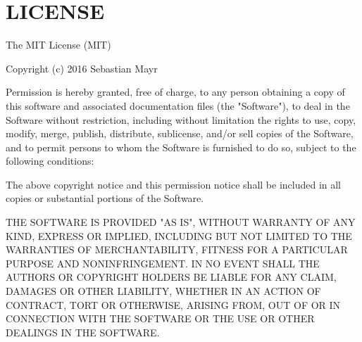 \chapter{LICENSE}
\hypertarget{md_pkiclassroomrescheduler_2src_2main_2frontend_2node__modules_2tr46_2_l_i_c_e_n_s_e}{}\label{md_pkiclassroomrescheduler_2src_2main_2frontend_2node__modules_2tr46_2_l_i_c_e_n_s_e}
The MIT License (MIT)

Copyright (c) 2016 Sebastian Mayr

Permission is hereby granted, free of charge, to any person obtaining a copy of this software and associated documentation files (the "{}\+Software"{}), to deal in the Software without restriction, including without limitation the rights to use, copy, modify, merge, publish, distribute, sublicense, and/or sell copies of the Software, and to permit persons to whom the Software is furnished to do so, subject to the following conditions\+:

The above copyright notice and this permission notice shall be included in all copies or substantial portions of the Software.

THE SOFTWARE IS PROVIDED "{}\+AS IS"{}, WITHOUT WARRANTY OF ANY KIND, EXPRESS OR IMPLIED, INCLUDING BUT NOT LIMITED TO THE WARRANTIES OF MERCHANTABILITY, FITNESS FOR A PARTICULAR PURPOSE AND NONINFRINGEMENT. IN NO EVENT SHALL THE AUTHORS OR COPYRIGHT HOLDERS BE LIABLE FOR ANY CLAIM, DAMAGES OR OTHER LIABILITY, WHETHER IN AN ACTION OF CONTRACT, TORT OR OTHERWISE, ARISING FROM, OUT OF OR IN CONNECTION WITH THE SOFTWARE OR THE USE OR OTHER DEALINGS IN THE SOFTWARE. 